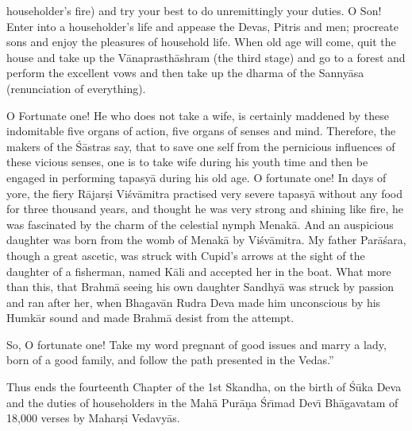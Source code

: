 householder's fire) and try your best to do unremittingly your duties. O Son! Enter into a householder's life and appease the Devas, Pitris and men; procreate sons and enjoy the pleasures of household life. When old age will come, quit the house and take up the V\=anaprasth\=ashram (the third stage) and go to a forest and perform the excellent vows and then take up the dharma of the Sanny\=asa (renunciation of everything).

O Fortunate one! He who does not take a wife, is certainly maddened by these indomitable five organs of action, five organs of senses and mind. Therefore, the makers of the \'S\=astras say, that to save one self from the pernicious influences of these vicious senses, one is to take wife during his youth time and then be engaged in performing tapasy\=a during his old age. O fortunate one! In days of yore, the fiery R\=ajar\d{s}i Vi\'sv\=amitra practised very severe tapasy\=a without any food for three thousand years, and thought he was very strong and shining like fire, he was fascinated by the charm of the celestial nymph Menak\=a. And an auspicious daughter was born from the womb of Menak\=a by Vi\'sv\=amitra. My father Par\=a\'sara, though a great ascetic, was struck with Cupid's arrows at the sight of the daughter of a fisherman, named K\=ali and accepted her in the boat. What more than this, that Brahm\=a seeing his own daughter Sandhy\=a was struck by passion and ran after her, when Bhagav\=an Rudra Deva made him unconscious by his Humk\=ar sound and made Brahm\=a desist from the attempt.

So, O fortunate one! Take my word pregnant of good issues and marry a lady, born of a good family, and follow the path presented in the Vedas.''

Thus ends the fourteenth Chapter of the 1st Skandha, on the birth of \'S\=uka Deva and the duties of householders in the Mah\=a Pur\=a\d{n}a \'Sr\={\i}mad Dev\={\i} Bh\=agavatam of 18,000 verses by Mahar\d{s}i Vedavy\=as.



